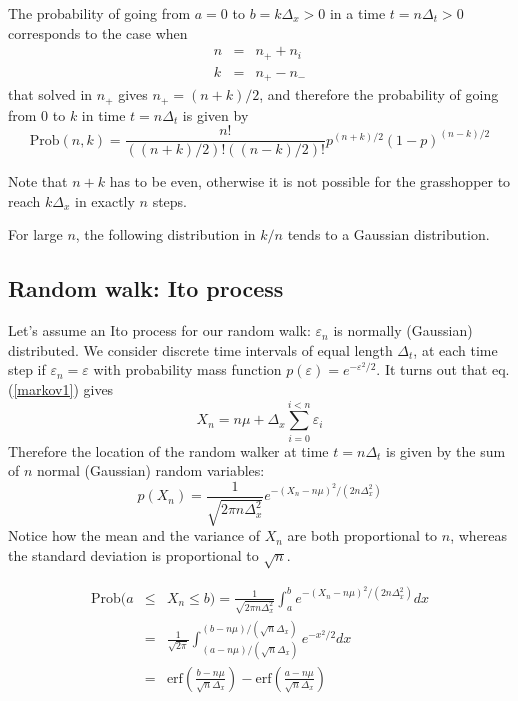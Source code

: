 \documentclass[justified,sixbynine]{tufte-book}
\theoremstyle{plain}%
\theoremstyle{definition}
\theoremstyle{remark}
\begin{document}
\begin{fullwidth}
The probability of going from $a=0$ to $b=k\Delta _x>0$ in a time $t=n\Delta
_t>0$ corresponds to the case when
\begin{eqnarray}
n &=&n_{+}+n_i \\
k &=&n_{+}-n_{-}
\end{eqnarray}
that solved in $n_{+}$ gives $n_{+}=(n+k)/2$, and therefore the probability
of going from $0$ to $k$ in time $t=n\Delta _t$ is given by
\begin{equation}
\textrm{Prob}(n,k)=\frac{n!}{((n+k)/2)!((n-k)/2)!}p^{(n+k)/2}(1-p)^{(n-k)/2}
\end{equation}

Note that $n+k$ has to be even, otherwise it is not possible for the
grasshopper to reach $k\Delta _x$ in exactly $n$ steps.

For large $n$, the following distribution in $k/n$ tends to a Gaussian distribution.

\goodbreak\subsection{Random walk: Ito process}

Let's assume an Ito process for our random walk: $\varepsilon _n$ is normally
(Gaussian) distributed. We consider discrete time intervals of equal length $%
\Delta _t$, at each time step if $\varepsilon _n=\varepsilon $ with
probability mass function $p(\varepsilon )=e^{-\varepsilon ^2/2}$. It turns
out that eq.(\ref{markov1}) gives
\begin{equation}
X_n = n \mu + \Delta _x\sum_{i=0}^{i<n}\varepsilon _i
\end{equation}
Therefore the location of the random walker at time $t=n\Delta _t$ is given
by the sum of $n$ normal (Gaussian) random variables:
\begin{equation}
p(X_n)=\frac 1{\sqrt{2\pi n\Delta _x^2}}e^{-(X_n - n\mu)^2/(2n\Delta _x^2)}
\end{equation}
Notice how the mean and the variance of $X_n$ are both proportional
to $n$, whereas the standard deviation is proportional to $\sqrt{n}$.

\begin{eqnarray}
\textrm{Prob}(a &\leq &X_n\leq b)=\frac 1{\sqrt{2\pi n\Delta _x^2}}\int_a^be^{-(X_n - n\mu)^2/(2n%
\Delta _x^2)}dx \\
&=&\frac 1{\sqrt{2\pi }}\int_{(a-n\mu)/(\sqrt{n}\Delta _x)}^{(b-n\mu)/(\sqrt{n}\Delta
_x)}e^{-x^2/2}dx \\
&=&\textrm{erf}(\frac {b-n\mu}{\sqrt{n}\Delta _x})-\textrm{erf}(\frac {a-n\mu}{\sqrt{n}\Delta
_x})
\end{eqnarray}


\end{fullwidth}
\end{document}
